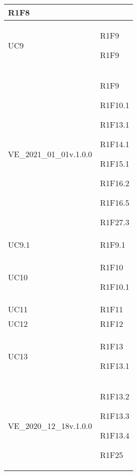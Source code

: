 \begin{center}
\begin{longtable}{|p{44mm}|p{22mm}|}
R1F8 \newline
\\
\hline
UC9 &

R1F9 \newline

R1F9 \newline
\\
\hline
VE\_2021\_01\_01v.1.0.0 &

R1F9 \newline

R1F10.1 \newline

R1F13.1 \newline

R1F14.1 \newline

R1F15.1 \newline

R1F16.2 \newline

R1F16.5 \newline

R1F27.3 \newline
\\
\hline
UC9.1 &

R1F9.1 \newline
\\
\hline
UC10 &

R1F10 \newline

R1F10.1 \newline
\\
\hline
UC11 &

R1F11 \newline
\\
\hline
UC12 &

R1F12 \newline
\\
\hline
UC13 &

R1F13 \newline

R1F13.1 \newline
\\
\hline
VE\_2020\_12\_18v.1.0.0 &

R1F13.2 \newline

R1F13.3 \newline

R1F13.4 \newline

R1F25 \newline


\end{longtable}
\end{center}
